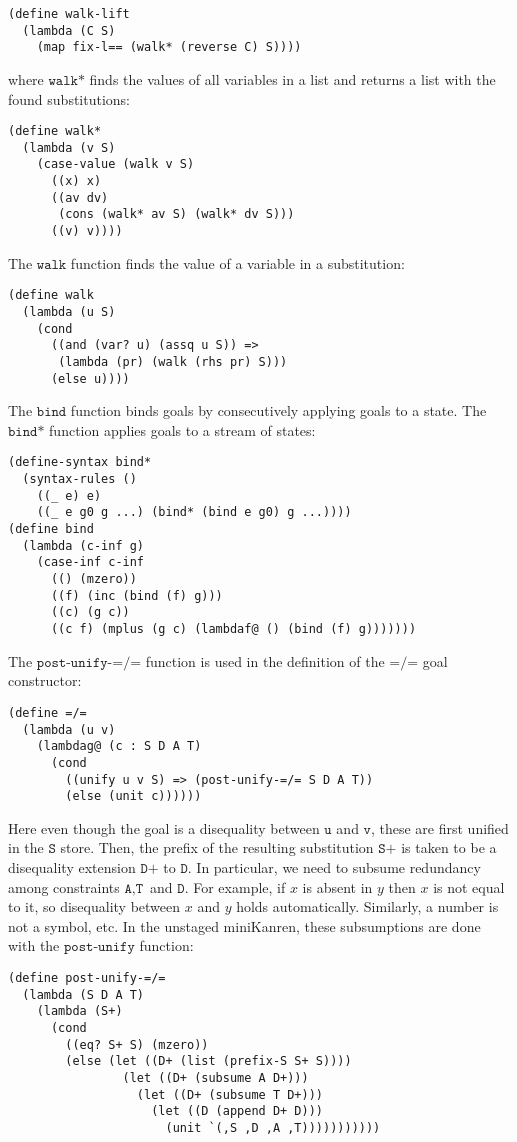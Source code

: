 \documentclass[11pt]{article}
\theoremstyle{definition}
\newcommand{\code}[1]{\texttt{#1}}
\begin{document}
\begin{lstlisting}
(define walk-lift
  (lambda (C S)
    (map fix-l== (walk* (reverse C) S))))
\end{lstlisting}
where $\code{walk*}$ finds the values of all variables in a list and returns a list with the found substitutions:
\begin{lstlisting}
(define walk*
  (lambda (v S)
    (case-value (walk v S)
      ((x) x)
      ((av dv)
       (cons (walk* av S) (walk* dv S)))
      ((v) v))))
\end{lstlisting}
The $\code{walk}$ function finds the value of a variable in a substitution:
\begin{lstlisting}
(define walk
  (lambda (u S)
    (cond
      ((and (var? u) (assq u S)) =>
       (lambda (pr) (walk (rhs pr) S)))
      (else u))))
\end{lstlisting}
The $\code{bind}$ function binds goals by consecutively applying goals to a state. The $\code{bind*}$ function applies goals to a stream of states:
\begin{lstlisting}
(define-syntax bind*
  (syntax-rules ()
    ((_ e) e)
    ((_ e g0 g ...) (bind* (bind e g0) g ...))))
(define bind
  (lambda (c-inf g)
    (case-inf c-inf
      (() (mzero))
      ((f) (inc (bind (f) g)))
      ((c) (g c))
      ((c f) (mplus (g c) (lambdaf@ () (bind (f) g)))))))
\end{lstlisting}
The $\code{post-unify-=/=}$ function is used in the definition of the $\code{=/=}$ goal constructor:
\begin{lstlisting}
(define =/= 
  (lambda (u v)
    (lambdag@ (c : S D A T)
      (cond
        ((unify u v S) => (post-unify-=/= S D A T))
        (else (unit c))))))
\end{lstlisting}
Here even though the goal is a disequality between $\code{u}$ and $\code{v}$, these are first unified in the $\code{S}$ store. Then, the prefix of the resulting substitution $\code{S+}$ is taken to be a disequality extension $\code{D+}$ to $\code{D}$.  In particular, we need to subsume redundancy among constraints $\code{A}, \code{T}$ and $\code{D}$. For example, if $x$ is absent in $y$ then $x$ is not equal to it, so disequality between $x$ and $y$ holds automatically. Similarly, a number is not a symbol, etc.
In the unstaged miniKanren, these subsumptions are done with the $\code{post-unify}$ function:
\begin{lstlisting}
(define post-unify-=/=	
  (lambda (S D A T)	
    (lambda (S+)	
      (cond	
        ((eq? S+ S) (mzero))	
        (else (let ((D+ (list (prefix-S S+ S))))	
                (let ((D+ (subsume A D+)))	
                  (let ((D+ (subsume T D+)))	
                    (let ((D (append D+ D)))	
                      (unit `(,S ,D ,A ,T)))))))))))
\end{lstlisting} 
\end{document}
